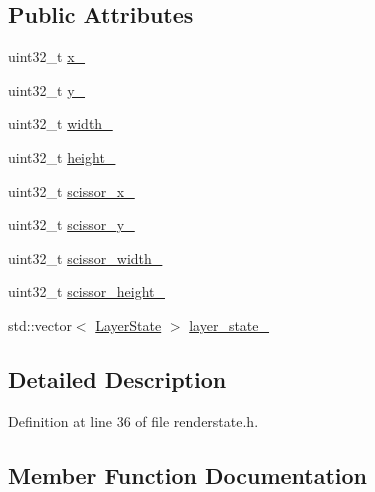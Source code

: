 \subsection*{Public Attributes}
\begin{DoxyCompactItemize}
\item 
uint32\+\_\+t \mbox{\hyperlink{structhwcomposer_1_1RenderState_ac7277dd3c8238665f4fd1095576c335a}{x\+\_\+}}
\item 
uint32\+\_\+t \mbox{\hyperlink{structhwcomposer_1_1RenderState_a6076ef9b49604c76ae1597ec760fa78a}{y\+\_\+}}
\item 
uint32\+\_\+t \mbox{\hyperlink{structhwcomposer_1_1RenderState_a950c10fc0b91f4ec42d700cf118ef716}{width\+\_\+}}
\item 
uint32\+\_\+t \mbox{\hyperlink{structhwcomposer_1_1RenderState_a864271759ea3e5f3e4f83a66b61226b9}{height\+\_\+}}
\item 
uint32\+\_\+t \mbox{\hyperlink{structhwcomposer_1_1RenderState_a9bca68d0755f69549395efb12ba3dbf1}{scissor\+\_\+x\+\_\+}}
\item 
uint32\+\_\+t \mbox{\hyperlink{structhwcomposer_1_1RenderState_a5910819755f80229de1ede18d4cddb6a}{scissor\+\_\+y\+\_\+}}
\item 
uint32\+\_\+t \mbox{\hyperlink{structhwcomposer_1_1RenderState_a709cadb231e2d5241f3d1693275612a2}{scissor\+\_\+width\+\_\+}}
\item 
uint32\+\_\+t \mbox{\hyperlink{structhwcomposer_1_1RenderState_a0fdd83e35b919db37b1a8f0a004b3d5b}{scissor\+\_\+height\+\_\+}}
\item 
std\+::vector$<$ \mbox{\hyperlink{structhwcomposer_1_1RenderState_1_1LayerState}{Layer\+State}} $>$ \mbox{\hyperlink{structhwcomposer_1_1RenderState_a68b934a6461758eb46e0bf5b4532212d}{layer\+\_\+state\+\_\+}}
\end{DoxyCompactItemize}


\subsection{Detailed Description}


Definition at line 36 of file renderstate.\+h.



\subsection{Member Function Documentation}
\mbox{\label{structhwcomposer_1_1RenderState_a52c9a4e17e61f8805f462a815bbe614e}} 
